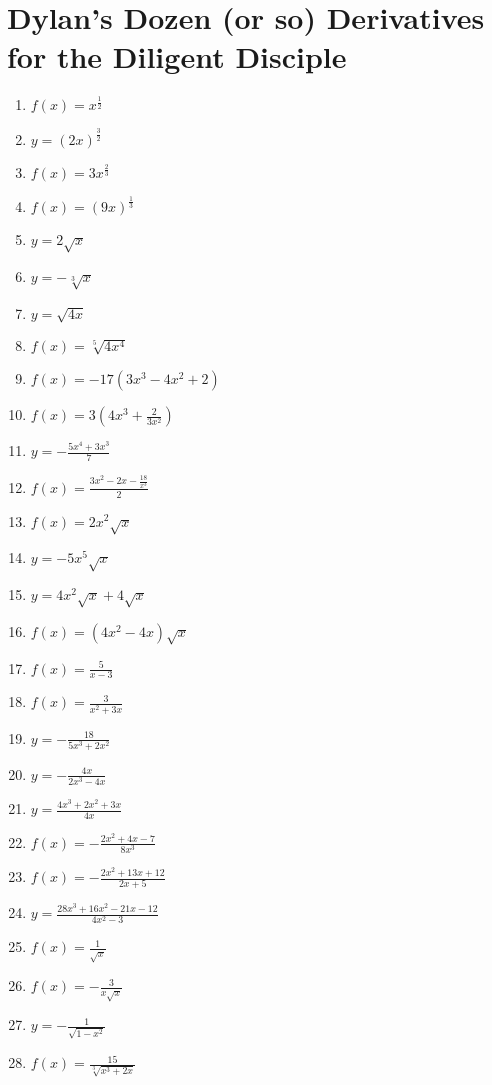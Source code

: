\documentclass[a4paper,10pt]{article}
\begin{document}
\section*{Dylan's Dozen (or so) Derivatives for the Diligent Disciple}
\fontsize{8pt}{8pt}
\begin{multicols}{3}
\begin{enumerate}
\item $f(x) = x^{\frac{1}{2}}$
\item $y = (2x)^{\frac{3}{2}}$
\item $f(x) = 3x^{\frac{2}{3}}$
\item $f(x) = (9x)^{\frac{1}{3}}$

\item $y = 2\sqrt{x}$
\item $y = -\sqrt[3]{x}$
\item $y = \sqrt{4x}$
\item $f(x) = \sqrt[5]{4x^4}$

\item $f(x) = -17(3x^3 - 4x^2 + 2)$
\item $f(x) = 3(4x^3 + \frac{2}{3x^2})$
\item $y = -\frac{5x^4 + 3x^3}{7}$
\item $f(x) = \frac{3x^2 - 2x -\frac{18}{x^3}}{2}$

\item $f(x) = 2x^2\sqrt{x}$
\item $y = -5x^5\sqrt{x}$
\item $y = 4x^2\sqrt{x} + 4\sqrt{x}$
\item $f(x) = (4x^2 - 4x)\sqrt{x}$

\item $f(x) = \frac{5}{x - 3}$
\item $f(x) = \frac{3}{x^2 + 3x}$
\item $y = -\frac{18}{5x^3 + 2x^2}$
\item $y = -\frac{4x}{2x^3 - 4x}$

\item $y = \frac{4x^3 + 2x^2 + 3x}{4x}$
\item $f(x) = -\frac{2x^2 + 4x - 7}{8x^3}$
\item $f(x) = -\frac{2x^2 + 13x + 12}{2x + 5}$
\item $y = \frac{28x^3 + 16x^2 - 21x - 12}{4x^2 - 3}$

\item $f(x) = \frac{1}{\sqrt{x}}$
\item $f(x) = -\frac{3}{x\sqrt{x}}$
\item $y = -\frac{1}{\sqrt{1 - x^2}}$
\item $f(x) = \frac{15}{\sqrt[3]{x^3 + 2x}}$


\end{enumerate}
\end{multicols}
\end{document}

